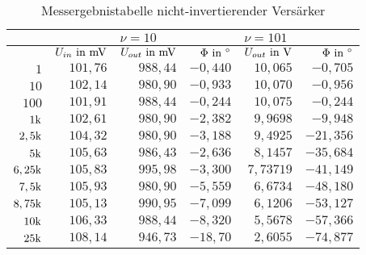 \begin{table}[H]
\centering
\caption{Messergebnistabelle nicht-invertierender Versärker}
\label{tab:niinv_erg_tab}
\begin{tabular}{rr||r|r||r|r|}
\cline{3-6}
                                                   &                & \multicolumn{2}{l|}{$\nu = 10$}     & \multicolumn{2}{l|}{$\nu=101$}          \\ \hline
\rowcolor[HTML]{C0C0C0} 
\multicolumn{1}{|r|}{\cellcolor[HTML]{C0C0C0}$f\text{ in }\Hz $} & $ U_{in}\text{ in }\text{mV}$ & $ U_{out}\text{ in }\text{mV} $    & $ \Phi\text{ in }^\circ $           & $ U_{out}\text{ in }\text{V} $       & $ \Phi \text{ in }^\circ $            \\ \hline
\multicolumn{1}{|r|}{$1        $}               & $ 101,76 $  & $ 988,44  $ & $ -0,440  $ & $ 10,065      $ & $ -0,705   $ \\ \hline
\multicolumn{1}{|r|}{$10      $}                & $ 102,14 $  & $ 980,90  $ & $ -0,933  $ & $ 10,070      $ & $ -0,956   $ \\ \hline
\multicolumn{1}{|r|}{$100      $}               & $ 101,91 $  & $ 988,44  $ & $ -0,244  $ & $ 10,075      $ & $ -0,244   $ \\ \hline
\multicolumn{1}{|r|}{$1\text{k}      $}                & $ 102,61 $  & $ 980,90  $ & $ -2,382  $ & $ 9,9698      $ & $ -9,948  $  \\ \hline
\multicolumn{1}{|r|}{$2,5\text{k}    $}                & $ 104,32 $  & $ 980,90  $ & $ -3,188  $ & $ 9,4925      $ & $ -21,356  $ \\ \hline
\multicolumn{1}{|r|}{$5\text{k}      $}                & $ 105,63 $  & $ 986,43  $ & $ -2,636  $ & $ 8,1457      $ & $ -35,684  $ \\ \hline
\multicolumn{1}{|r|}{$6,25\text{k}   $}                & $ 105,83 $  & $ 995,98  $ & $ -3,300  $ & $ 7,73719     $ & $ -41,149  $ \\ \hline
\multicolumn{1}{|r|}{$7,5\text{k}    $}                & $ 105,93 $  & $ 980,90  $ & $ -5,559  $ & $ 6,6734      $ & $ -48,180  $ \\ \hline
\multicolumn{1}{|r|}{$8,75\text{k}   $}                & $ 105,13 $  & $ 990,95  $ & $ -7,099  $ & $ 6,1206      $ & $ -53,127  $ \\ \hline
\multicolumn{1}{|r|}{$10\text{k}     $}                & $ 106,33 $  & $ 988,44  $ & $ -8,320  $ & $ 5,5678      $ & $ -57,366  $ \\ \hline
\multicolumn{1}{|r|}{$25\text{k}     $}                & $ 108,14 $  & $ 946,73  $ & $ -18,70  $ & $ 2,6055      $ & $ -74,877  $ \\ \hline

\end{tabular}
\end{table}
